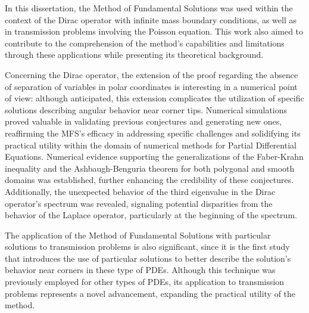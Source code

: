 \label{chap:conclusion}

In this dissertation, the Method of Fundamental Solutions was used within the context of the Dirac operator with infinite mass boundary conditions, as well as in transmission problems involving the Poisson equation. This work also aimed to contribute to the comprehension of the method's capabilities and limitations through these applications while presenting its theoretical background.

Concerning the Dirac operator, the extension of the proof regarding the absence of separation of variables in polar coordinates is interesting in a numerical point of view: although anticipated, this extension complicates the utilization of specific solutions describing angular behavior near corner tips. Numerical simulations proved valuable in validating previous conjectures and generating new ones, reaffirming the \ac{MFS}'s efficacy in addressing specific challenges and solidifying its practical utility within the domain of numerical methods for Partial Differential Equations. Numerical evidence supporting the generalizations of the Faber-Krahn inequality and the Ashbaugh-Benguria theorem for both polygonal and smooth domains was established, further enhancing the credibility of these conjectures. Additionally, the unexpected behavior of the third eigenvalue in the Dirac operator's spectrum was revealed, signaling potential disparities from the behavior of the Laplace operator, particularly at the beginning of the spectrum.

The application of the Method of Fundamental Solutions with particular solutions to transmission problems is also significant, since it is the first study that introduces the use of particular solutions to better describe the solution's behavior near corners in these type of \ac{PDE}s. Although this technique was previously employed for other types of \ac{PDE}s, its application to transmission problems represents a novel advancement, expanding the practical utility of the method.

